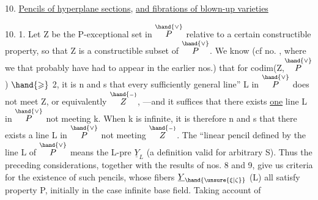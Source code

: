 
10. \uline{Pencils of hyperplane sections}, \uline{and fibrations of blown-up varieties}

10. 1. Let Z be the P-exceptional set in $\overset{\hand{\vee}}{P}$ relative to a
certain constructible property, so that Z is a constructible subset
of $\overset{\hand{\vee}}{P}$.  We know (cf no. , where we 
 that  probably have had to appear in the earlier nos.) that for
codim(Z,$\overset{\hand{\vee}}{P}$) $\hand{\geqslant}$ 2,
it is n and s that every sufficiently
general line” L in $\overset{\hand{\vee}}{P}$ does not meet Z,  or equivalently $\overset{\hand{\scriptscriptstyle -}}{Z}$, —and it suffices
that there exists \uline{one} line L in $\overset{\hand{\vee}}{P}$ not meeting k. When 
k is infinite, it is therefore n and s that there exists a line L in $\overset{\hand{\vee}}{P}$ not meeting
$\overset{\hand{\scriptscriptstyle -}}{Z}$. The “linear pencil defined by the line
L of $\overset{\hand{\vee}}{P}$\hand{,} means the L-pre $\underline{Y}_L$ (a definition valid for arbitrary S).
Thus the preceding considerations, together with the results of nos. 8 and 9,
give us criteria for the existence of such pencils, whose fibers
$\underline{Y}_{\hand{\unsure{\xi|\zeta}}}$ (\hand{$\unsure{\xi|\zeta} \in$}L) all satisfy property P, initially in the
case   infinite base field.  Taking account of
